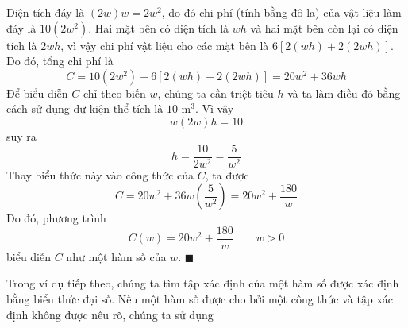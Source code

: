 \begin{minipage}[t]{0.708\textwidth}
    Diện tích đáy là $(2w)w = 2w^2$, do đó chi phí (tính bằng đô la) của vật liệu làm đáy là $10(2w^2)$. Hai mặt bên có diện tích là $wh$ và hai mặt bên còn lại có diện tích là $2wh$, vì vậy chi phí vật liệu cho các mặt bên là $6[2(wh) + 2(2wh)]$. Do đó, tổng chi phí là
    \[
    C = 10(2w^2) + 6[2(wh) + 2(2wh)] = 20w^2 + 36wh
    \]
    Để biểu diễn $C$ chỉ theo biến $w$, chúng ta cần triệt tiêu $h$ và ta làm điều đó bằng cách sử dụng dữ kiện thể tích là $10\text{ m}^3$. Vì vậy
    \[
    w(2w)h = 10
    \]
    suy ra
    \[
    h = \frac{10}{2w^2} = \frac{5}{w^2}
    \]
    Thay biểu thức này vào công thức của $C$, ta được
    \[
    C = 20w^2 + 36w\left(\frac{5}{w^2}\right) = 20w^2 + \frac{180}{w}
    \]
    Do đó, phương trình
    \[
    C(w) = 20w^2 + \frac{180}{w}\qquad w > 0
    \]
    biểu diễn $C$ như một hàm số của $w$. \hfill{\color{stewartcyan}$\blacksquare$}

    \vspace{0.3cm}
    Trong ví dụ tiếp theo, chúng ta tìm tập xác định của một hàm số được xác định bằng biểu thức đại số. Nếu một hàm số được cho bởi một công thức và tập xác định không được nêu rõ, chúng ta sử dụng
\end{minipage}